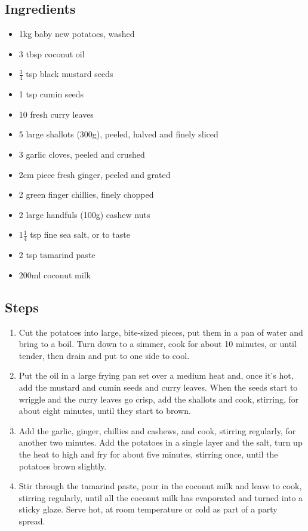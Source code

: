 \documentclass{book}
\begin{document}
\subsection*{Ingredients}
\begin{itemize}
\item 1kg baby new potatoes, washed
\item 3 tbsp coconut oil
\item $\frac{3}{4}$ tsp black mustard seeds
\item 1 tsp cumin seeds
\item 10 fresh curry leaves
\item 5 large shallots (300g), peeled, halved and finely sliced
\item 3 garlic cloves, peeled and crushed
\item 2cm piece fresh ginger, peeled and grated
\item 2 green finger chillies, finely chopped
\item 2 large handfuls (100g) cashew nuts
\item 1$\frac{1}{4}$ tsp fine sea salt, or to taste
\item 2 tsp tamarind paste
\item 200ml coconut milk
\end{itemize}

\subsection*{Steps}
\begin{enumerate}
\item Cut the potatoes into large, bite-sized pieces, put them in a pan of water and bring to a boil. Turn down to a simmer, cook for about 10 minutes, or until tender, then drain and put to one side to cool.
\item Put the oil in a large frying pan set over a medium heat and, once it’s hot, add the mustard and cumin seeds and curry leaves. When the seeds start to wriggle and the curry leaves go crisp, add the shallots and cook, stirring, for about eight minutes, until they start to brown.
\item Add the garlic, ginger, chillies and cashews, and cook, stirring regularly, for another two minutes. Add the potatoes in a single layer and the salt, turn up the heat to high and fry for about five minutes, stirring once, until the potatoes brown slightly.
\item Stir through the tamarind paste, pour in the coconut milk and leave to cook, stirring regularly, until all the coconut milk has evaporated and turned into a sticky glaze. Serve hot, at room temperature or cold as part of a party spread.
\end{enumerate}
\newpage
\end{document}
